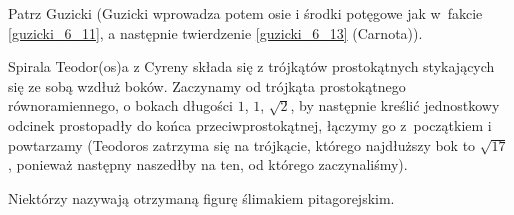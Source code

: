 Patrz Guzicki \cite[s. 170-173]{guzicki_2021} (Guzicki wprowadza potem osie i środki potęgowe jak w~fakcie \ref{guzicki_6_11}, a następnie twierdzenie \ref{guzicki_6_13} (Carnota)).

Spirala Teodor(os)a z Cyreny składa się z trójkątów prostokątnych stykających się ze sobą wzdłuż boków.
%
%
Zaczynamy od trójkąta prostokątnego równoramiennego, o bokach długości $1$, $1$, $\sqrt{2}$, by następnie kreślić jednostkowy odcinek prostopadły do końca przeciwprostokątnej, łączymy go z~początkiem i powtarzamy (Teodoros zatrzyma się na trójkącie, którego najdłuższy bok to $\sqrt{17}$, ponieważ następny naszedłby na ten, od którego zaczynaliśmy).
\begin{center}
\begin{comment}
    \begin{tikzpicture}[scale=.7]
        \tkzDefPoints{0.0000000000000000/0.0000000000000000/sqrt0,1.0000000000000000/0.0000000000000000/sqrt1,1.0000000000000002/1.0000000000000000/sqrt2,0.2928932188134524/1.7071067811865475/sqrt3,-0.6927053408400360/1.8762087599123103/sqrt4,-1.6308097207961914/1.5298560894922923/sqrt5,-2.3149821631755443/0.8005358106787454/sqrt6,-2.6417995393402450/-0.1445516998920071/sqrt7,-2.5871641322679750/-1.1430580705747615/sqrt8,-2.1830320757712630/-2.0577587215594090/sqrt9,-1.4971125019181266/-2.7854360801498297/sqrt10,-0.6162802729096475/-3.2588646221072777/sqrt11,0.3663043810988235/-3.4446801158290160/sqrt12,1.3606978771718410/-3.3389371493126440/sqrt13,2.2867524231255560/-2.9615474595774080/sqrt14,3.0782592751547995/-2.3503871670266260/sqrt15,3.6851266321570497/-1.5555840398277552/sqrt16,4.0740226421139890/-0.634302381788492/sqrt17}
        \tkzDrawPolygons[line width=0.2mm](sqrt0,sqrt1,sqrt2 sqrt0,sqrt2,sqrt3 sqrt0,sqrt3,sqrt4 sqrt0,sqrt4,sqrt5 sqrt0,sqrt5,sqrt6 sqrt0,sqrt6,sqrt7 sqrt0,sqrt7,sqrt8 sqrt0,sqrt8,sqrt9 sqrt0,sqrt9,sqrt10 sqrt0,sqrt10,sqrt11 sqrt0,sqrt11,sqrt12 sqrt0,sqrt12,sqrt13 sqrt0,sqrt13,sqrt14 sqrt0,sqrt14,sqrt15 sqrt0,sqrt15,sqrt16 sqrt0,sqrt16,sqrt17)
        \tkzMarkRightAngle[size=0.25](sqrt0,sqrt1,sqrt2)
        \tkzMarkRightAngle[size=0.25](sqrt0,sqrt2,sqrt3)
        \tkzMarkRightAngle[size=0.25](sqrt0,sqrt3,sqrt4)
        \tkzMarkRightAngle[size=0.25](sqrt0,sqrt4,sqrt5)
        \tkzMarkRightAngle[size=0.25](sqrt0,sqrt5,sqrt6)
        \tkzMarkRightAngle[size=0.25](sqrt0,sqrt6,sqrt7)
        \tkzMarkRightAngle[size=0.25](sqrt0,sqrt7,sqrt8)
        \tkzMarkRightAngle[size=0.25](sqrt0,sqrt8,sqrt9)
        \tkzMarkRightAngle[size=0.25](sqrt0,sqrt9,sqrt10)
        \tkzMarkRightAngle[size=0.25](sqrt0,sqrt10,sqrt11)
        \tkzMarkRightAngle[size=0.25](sqrt0,sqrt11,sqrt12)
        \tkzMarkRightAngle[size=0.25](sqrt0,sqrt12,sqrt13)
        \tkzMarkRightAngle[size=0.25](sqrt0,sqrt13,sqrt14)
        \tkzMarkRightAngle[size=0.25](sqrt0,sqrt14,sqrt15)
        \tkzMarkRightAngle[size=0.25](sqrt0,sqrt15,sqrt16)
        \tkzMarkRightAngle[size=0.25](sqrt0,sqrt16,sqrt17)
\end{tikzpicture}
\end{comment}
\end{center}
Niektórzy nazywają otrzymaną figurę ślimakiem pitagorejskim.
